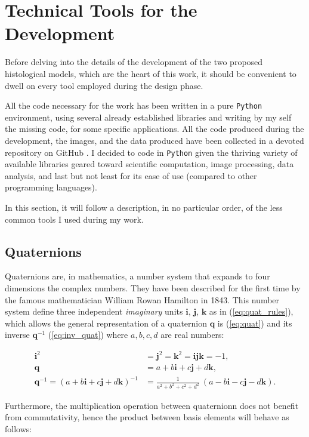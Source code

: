 \section{Technical Tools for the Development} \label{sec:tech_tool}
Before delving into the details of the development of the two proposed histological models, which are the heart of this work, it should be convenient to dwell on every tool employed during the design phase.

All the code necessary for the work has been written in a pure \texttt{Python} environment, using several already established libraries and writing by my self the missing code, for some specific applications. All the code produced during the development, the images, and the data produced have been collected in a devoted repository on GitHub \cite{repo}. I decided to code in \texttt{Python} given the thriving variety of available libraries geared toward scientific computation, image processing, data analysis, and last but not least for its ease of use (compared to other programming languages).

In this section, it will follow a description, in no particular order, of the less common tools I used during my work.

\subsection{Quaternions} \label{ssec:quat}
Quaternions are, in mathematics, a number system that expands to four dimensions the complex numbers. They have been described for the first time by the famous mathematician William Rowan Hamilton in 1843. This number system define three independent \textit{imaginary} units $\bm{i}$, $\bm{j}$, $\bm{k}$ as in (\ref{eq:quat_rules}), which allows the general representation of a quaternion $\bm{q}$ is (\ref{eq:quat}) and its inverse $\bm{q}^{-1}$ (\ref{eq:inv_quat}) where $a,b,c,d$ are real numbers:

\begin{align}
    \bm{i}^2 & = \bm{j}^2 = \bm{k}^2 = \bm{i}\bm{j}\bm{k} = -1, \label{eq:quat_rules}\\
    \bm{q} & = a + b\bm{i} + c\bm{j} + d\bm{k}, \label{eq:quat}\\
    \bm{q}^{-1 } = (a + b\bm{i} + c\bm{j} + d\bm{k})^{-1} & = \frac{1}{a^2 + b^2 + c^2 +d^2}\ (a - b\bm{i} - c\bm{j} - d\bm{k}). \label{eq:inv_quat}
\end{align}

Furthermore, the multiplication operation between quaternionn does not benefit from commutativity, hence the product between basis elements will behave as follows:

